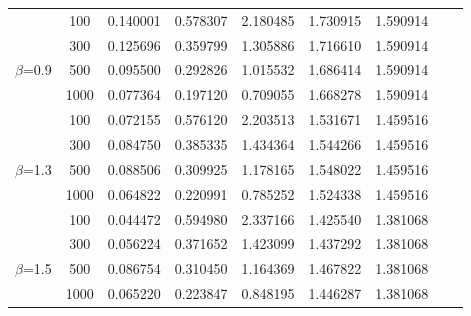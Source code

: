 \documentclass[12pt,a4paper]{article}
\numberwithin{equation}{section}
\begin{document}
\begin{table}[!htbp]
\begin{tabular}{ccccccccc}
		&100 &0.140001&0.578307&2.180485&1.730915&1.590914\\
		&300 &0.125696&0.359799&1.305886&1.716610&1.590914\\
		$\beta$=0.9&500 &0.095500&0.292826&1.015532&1.686414&1.590914\\
		&1000&0.077364&0.197120&0.709055&1.668278&1.590914\\
		\hline
		
		&100 &0.072155&0.576120&2.203513&1.531671&1.459516\\
		&300 &0.084750&0.385335&1.434364&1.544266&1.459516\\
		$\beta$=1.3&500 &0.088506&0.309925&1.178165&1.548022&1.459516\\
		&1000&0.064822&0.220991&0.785252&1.524338&1.459516\\
		\hline
		
		&100 &0.044472&0.594980&2.337166&1.425540&1.381068\\
		&300 &0.056224&0.371652&1.423099&1.437292&1.381068\\
		$\beta$=1.5&500 &0.086754&0.310450&1.164369&1.467822&1.381068\\
		&1000&0.065220&0.223847&0.848195&1.446287&1.381068\\
		\bottomrule
	\end{tabular}
\end{table}
\end{document}
